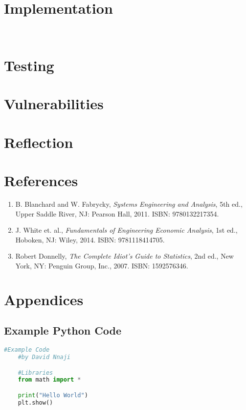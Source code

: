 \section{Implementation}
	\

\section{Testing}
\section{Vulnerabilities}
\section{Reflection}
\section*{References}
	\begin{enumerate}
		\item \label{Blanchard} B. Blanchard and W. Fabrycky, \textit{Systems Engineering and Analysis}, 5th ed., Upper Saddle River, NJ: Pearson Hall, 2011. ISBN: 9780132217354.
		\item \label{White} J. White et. al., \textit{Fundamentals of Engineering Economic Analysis}, 1st ed.,  Hoboken, NJ: Wiley, 2014. ISBN: 9781118414705.
		\item \label{Donnelly} Robert Donnelly, \textit{The Complete Idiot's Guide to Statistics}, 2nd ed., New York, NY: Penguin Group, Inc., 2007. ISBN: 1592576346.
	\end{enumerate}

\section*{Appendices}
	\subsection*{Example Python Code}
	\begin{lstlisting}[language=Python,caption=Example Code]
	#Example Code
	#by David Nnaji

	#Libraries
	from math import *

	print("Hello World")
	plt.show()\end{lstlisting}
